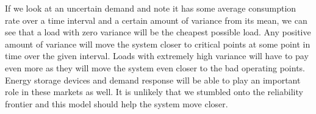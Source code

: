 \documentclass[class=report]{standalone}
\begin{document}
If we look at an uncertain demand and note it has some average consumption rate over a time interval and a certain amount of variance from its mean, we can see that a load with zero variance will be the cheapest possible load.  Any positive amount of variance will move the system closer to critical points at some point in time over the given interval.  Loads with extremely high variance will have to pay even more as they will move the system even closer to the bad operating points.  Energy storage devices and demand response will be able to play an important role in these markets as well.  It is unlikely that we stumbled onto the reliability frontier and this model should help the system move closer.  
\end{document}
